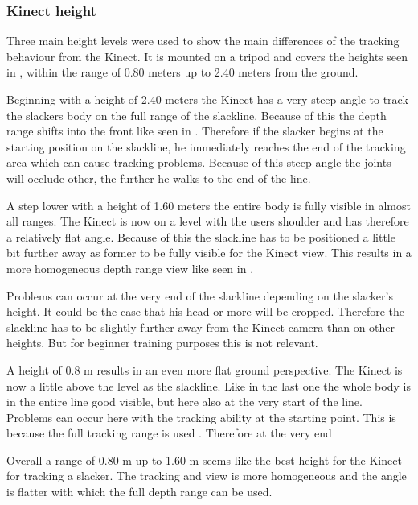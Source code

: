 \subsubsection{Kinect height}
Three main height levels were used to show the main differences of the tracking behaviour from the Kinect. It is mounted on a tripod and covers the heights seen in \textbf{}, within the range of 0.80 meters up to 2.40 meters from the ground. 

Beginning with a height of 2.40 meters the Kinect has a very steep angle to track the slackers body on the full range of the slackline. Because of this the depth range shifts into the front like seen in \textbf{}. Therefore if the slacker begins at the starting position on the slackline, he immediately reaches the end of the tracking area which can cause tracking problems. Because of this steep angle the joints will occlude other, the further he walks to the end of the line.

A step lower with a height of 1.60 meters the entire body is fully visible in almost all ranges. The Kinect is now on a level with the users shoulder and has therefore a relatively flat angle. Because of this the slackline has to be positioned a little bit further away as former to be fully visible for the Kinect view. This results in a more homogeneous depth range view like seen in \textbf{}.

Problems can occur at the very end of the slackline depending on the slacker’s height. It could be the case that his head or more will be cropped. Therefore the slackline has to be slightly further away from the Kinect camera than on other heights. But for beginner training purposes this is not relevant.

A height of 0.8 m results in an even more flat ground perspective. The Kinect is now a little above the level as the slackline. Like in the last one the whole body is in the entire line good visible, but here also at the very start of the line. Problems can occur here with the tracking ability at the starting point. This is because the full tracking range is used \textbf{}. Therefore at the very end  

Overall a range of 0.80 m up to 1.60 m seems like the best height for the Kinect for tracking a slacker. The tracking and view is more homogeneous and the angle is flatter with which the full depth range can be used.


